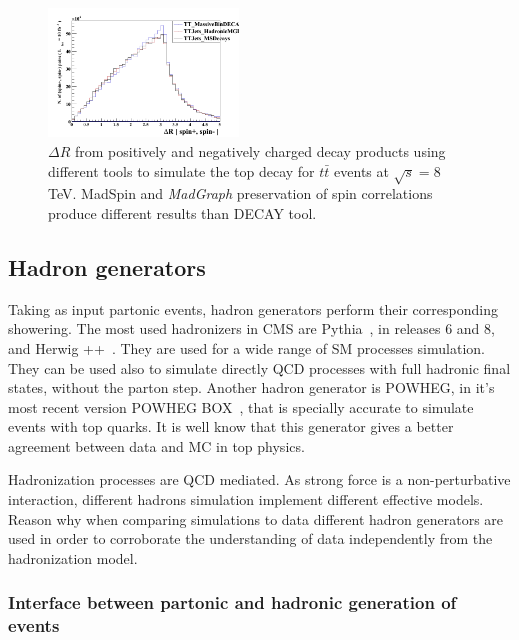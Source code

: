 \begin{figure}[!Hhtbp]
  \begin{center}
    \includegraphics[width=0.45\textwidth]{figs/TT_MadSPin_2.png}
    \caption{$\Delta R$ from positively and negatively charged decay products using different tools to simulate the top decay for $t\bar{t}$ events at $\sqrt{s}=8$ TeV. MadSpin and \textit{MadGraph} preservation of spin correlations produce different results than DECAY tool.}
    \label{fig:MS2}
  \end{center}
\end{figure}

\subsection{Hadron generators}
\label{sec:Had}

Taking as input partonic events, hadron generators perform their corresponding showering. The most used hadronizers in CMS are Pythia~\cite{Sjostrand:2006za}, in releases 6 and 8, and Herwig ++~\cite{Bahr:2008pv}. They are used for a wide range of SM processes simulation. They can be used also to simulate directly QCD processes with full hadronic final states, without the parton step. Another hadron generator is POWHEG, in it's most recent version POWHEG BOX~\cite{Nason:2004rx, Frixione:2007vw, Alioli:2010xd}, that is specially accurate to simulate events with top quarks. It is well know that this generator gives a better agreement between data and MC in top physics.

Hadronization processes are QCD mediated. As strong force is a non-perturbative interaction, different hadrons simulation implement different effective models. Reason why when comparing simulations to data different hadron generators are used in order to corroborate the understanding of data independently from the hadronization model. 

\subsubsection{Interface between partonic and hadronic generation of events}
\label{sec:Merging}



